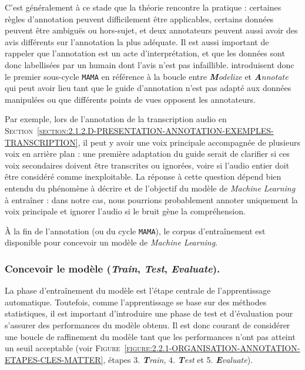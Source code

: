 			\begin{leftBarInformation}
				C'est généralement à ce stade que la théorie rencontre la pratique : certaines règles d'annotation peuvent difficilement être applicables, certains données peuvent être ambiguës ou hors-sujet, et deux annotateurs peuvent aussi avoir des avis différents sur l'annotation la plus adéquate.
				Il est aussi important de rappeler que l’annotation est un acte d'interprétation, et que les données sont donc labellisées par un humain dont l'avis n'est pas infaillible. 
				\cite{pustejovsky-stubbs:2012:natural-language-annotation} introduisent donc le premier sous-cycle \texttt{MAMA} en référence à la boucle entre \textit{\textbf{M}odelize} et \textit{\textbf{A}nnotate} qui peut avoir lieu tant que le guide d'annotation n'est pas adapté aux données manipulées ou que différents points de vues opposent les annotateurs.
				
				Par exemple, lors de l'annotation de la transcription audio en \textsc{Section~\ref{section:2.1.2.D-PRESENTATION-ANNOTATION-EXEMPLES-TRANSCRIPTION}}, il peut y avoir une voix principale accompagnée de plusieurs voix en arrière plan : une première adaptation du guide serait de clarifier si ces voix secondaires doivent être transcrites ou ignorées, voire si l'audio entier doit être considéré comme inexploitable.
				La réponse à cette question dépend bien entendu du phénomène à décrire et de l'objectif du modèle de \textit{Machine Learning} à entraîner : dans notre cas, nous pourrions probablement annoter uniquement la voix principale et ignorer l'audio si le bruit gène la compréhension.
			\end{leftBarInformation}
			
			À la fin de l'annotation (ou du cycle \texttt{MAMA}), le corpus d'entraînement est disponible pour concevoir un modèle de \textit{Machine Learning}.
		
		
		\subsubsection{Concevoir le modèle (\textit{\textbf{T}rain}, \textit{\textbf{T}est}, \textit{\textbf{E}valuate}).}
		\label{section:2.2.1.B-ORGANISATION-ANNOTATION-ETAPES-CLES-TRAIN-TEST}
			
			La phase d'entraînement du modèle est l'étape centrale de l'apprentissage automatique.
			Toutefois, comme l'apprentissage se base sur des méthodes statistiques, il est important d'introduire une phase de test et d'évaluation pour s'assurer des performances du modèle obtenu.
			Il est donc courant de considérer une boucle de raffinement du modèle tant que les performances n'ont pas atteint un seuil acceptable (voir \textsc{Figure~\ref{figure:2.2.1-ORGANISATION-ANNOTATION-ETAPES-CLES-MATTER}}, étapes 3. \textit{\textbf{T}rain}, 4. \textit{\textbf{T}est} et 5. \textit{\textbf{E}valuate}).
			
